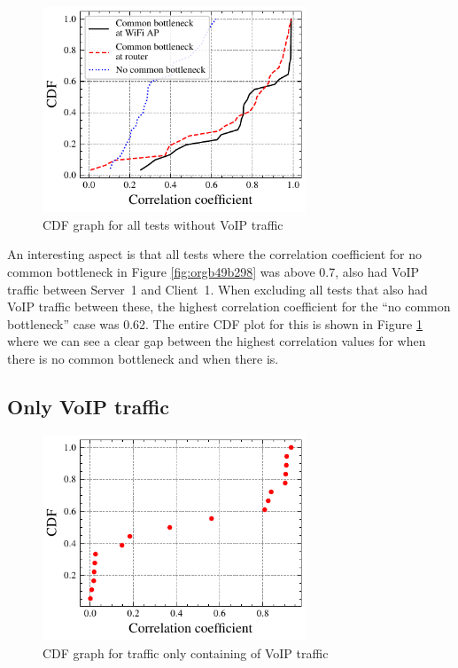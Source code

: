 \documentclass[a4paper,11pt]{article}
\begin{document}
\begin{figure}[htbp]
\centering
\includegraphics[width=0.7\textwidth]{figures/results/all-over2-no-video.pdf}
\caption{\label{fig:orga3088e6}CDF graph for all tests without VoIP traffic}
\end{figure}

An interesting aspect is that all tests where the correlation coefficient for no common bottleneck in Figure \ref{fig:orgb49b298} was above 0.7, also had VoIP traffic between Server~1 and Client~1. When excluding all tests that also had VoIP traffic between these, the highest correlation coefficient for the ``no common bottleneck'' case was 0.62. The entire CDF plot for this is shown in Figure \ref{fig:orga3088e6} where we can see a clear gap between the highest correlation values for when there is no common bottleneck and when there is.
\subsection{Only VoIP traffic}
\label{sec:org8a6a70d}
\begin{figure}[htbp]
\centering
\includegraphics[width=0.7\textwidth]{figures/results/only-video-combined.pdf}
\caption{\label{fig:org01c4a4b}CDF graph for traffic only containing of VoIP traffic}
\end{figure}
\end{document}

